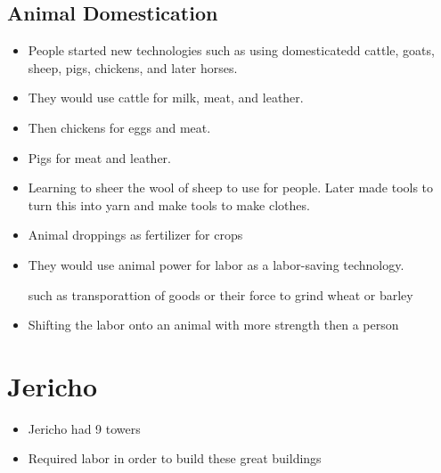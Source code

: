 \documentclass{article}
\begin{document}
\subsection{Animal Domestication}

\begin{itemize}
  \item People started new technologies such as using domesticatedd cattle,
    goats, sheep, pigs, chickens, and later horses.
  \item They would use cattle for milk, meat, and leather.
  \item Then chickens for eggs and meat.
  \item Pigs for meat and leather.
  \item Learning to sheer the wool of sheep to
    use for people. Later made tools to turn this into yarn
    and make tools to make clothes.
  \item Animal droppings as fertilizer for crops
  \item They would use animal power for labor as a labor-saving technology.

    such as transporattion of goods or their force to grind wheat or barley
  \item Shifting the labor onto an animal with more strength then a person
\end{itemize}


\section*{Jericho}
\begin{itemize}
  \item Jericho had 9 towers
  \item Required labor in order to build these great
    buildings
\end{itemize}
\end{document}
